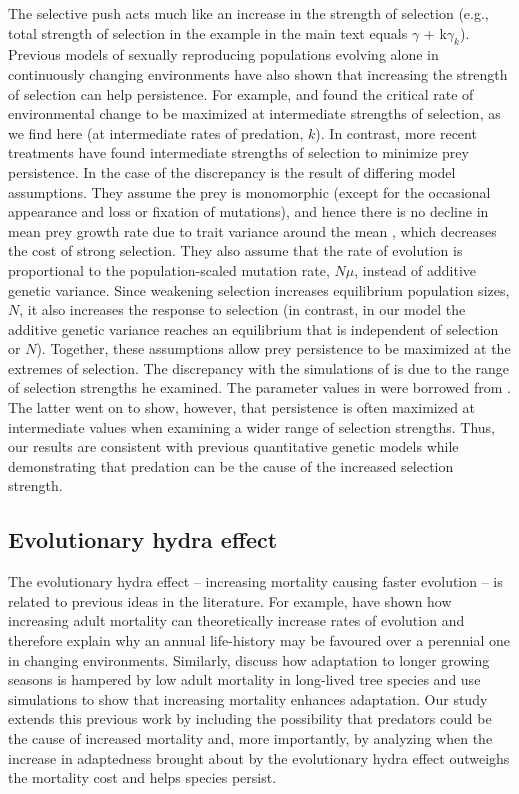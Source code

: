 \documentclass[11pt]{article}
\begin{document}
The selective push acts much like an increase in the strength of selection (e.g., total strength of selection in the example in the main text equals $\gamma$ + k$\gamma_k$).
Previous models of sexually reproducing populations evolving alone in continuously changing environments have also shown that increasing the strength of selection can help persistence. 
For example, \cite{Lynch1993} and \cite{Burger1995,Burger1997} found the critical rate of environmental change to be maximized at intermediate strengths of selection, as we find here (at intermediate rates of predation, $k$).
In contrast, more recent treatments \citep{Jones2008,Mellard2015} have found intermediate strengths of selection to minimize prey persistence.
In the case of \cite{Mellard2015} the discrepancy is the result of differing model assumptions.
They assume the prey is monomorphic (except for the occasional appearance and loss or fixation of mutations), and hence there is no decline in mean prey growth rate due to trait variance around the mean \citep[genetic load;][]{Lande1996}, which decreases the cost of strong selection.
They also assume that the rate of evolution is proportional to the population-scaled mutation rate, $N\mu$, instead of additive genetic variance.
Since weakening selection increases equilibrium population sizes, $N$, it also increases the response to selection (in contrast, in our model the additive genetic variance reaches an equilibrium that is independent of selection or $N$).
Together, these assumptions allow prey persistence to be maximized at the extremes of selection.
The discrepancy with the simulations of \cite{Jones2008} is due to the range of selection strengths he examined.
The parameter values in \cite{Jones2008} were borrowed from \cite{Burger1995}.
The latter went on to show, however, that persistence is often maximized at intermediate values when examining a wider range of selection strengths.
Thus, our results are consistent with previous quantitative genetic models while demonstrating that predation can be the cause of the increased selection strength.

\subsection*{Evolutionary hydra effect}

The evolutionary hydra effect -- increasing mortality causing faster evolution -- is related to previous ideas in the literature.
For example, \cite{Zeineddine2009} have shown how increasing adult mortality can theoretically increase rates of evolution and therefore explain why an annual life-history may be favoured over a perennial one in changing environments.
Similarly, \citeauthor{Kuparinen2010} \citeyearpar[][and references within]{Kuparinen2010} discuss how adaptation to longer growing seasons is hampered by low adult mortality in long-lived tree species and use simulations to show that increasing mortality enhances adaptation.
Our study extends this previous work by including the possibility that predators could be the cause of increased mortality and, more importantly, by analyzing when the increase in adaptedness brought about by the evolutionary hydra effect outweighs the mortality cost and helps species persist.
\end{document}
